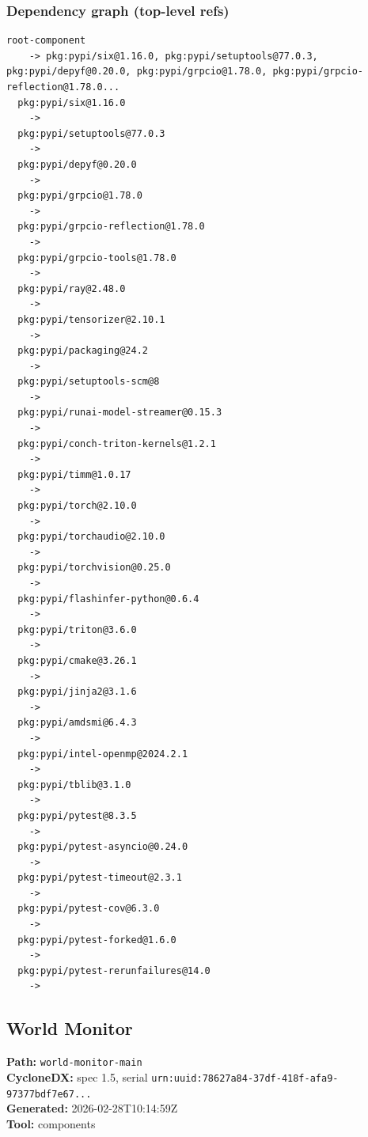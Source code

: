 \documentclass[11pt,a4paper]{article}
\begin{document}
\subsubsection*{Dependency graph (top-level refs)}
\begin{lstlisting}[style=depgraph]
  root-component
    -> pkg:pypi/six@1.16.0, pkg:pypi/setuptools@77.0.3, pkg:pypi/depyf@0.20.0, pkg:pypi/grpcio@1.78.0, pkg:pypi/grpcio-reflection@1.78.0...
  pkg:pypi/six@1.16.0
    -> 
  pkg:pypi/setuptools@77.0.3
    -> 
  pkg:pypi/depyf@0.20.0
    -> 
  pkg:pypi/grpcio@1.78.0
    -> 
  pkg:pypi/grpcio-reflection@1.78.0
    -> 
  pkg:pypi/grpcio-tools@1.78.0
    -> 
  pkg:pypi/ray@2.48.0
    -> 
  pkg:pypi/tensorizer@2.10.1
    -> 
  pkg:pypi/packaging@24.2
    -> 
  pkg:pypi/setuptools-scm@8
    -> 
  pkg:pypi/runai-model-streamer@0.15.3
    -> 
  pkg:pypi/conch-triton-kernels@1.2.1
    -> 
  pkg:pypi/timm@1.0.17
    -> 
  pkg:pypi/torch@2.10.0
    -> 
  pkg:pypi/torchaudio@2.10.0
    -> 
  pkg:pypi/torchvision@0.25.0
    -> 
  pkg:pypi/flashinfer-python@0.6.4
    -> 
  pkg:pypi/triton@3.6.0
    -> 
  pkg:pypi/cmake@3.26.1
    -> 
  pkg:pypi/jinja2@3.1.6
    -> 
  pkg:pypi/amdsmi@6.4.3
    -> 
  pkg:pypi/intel-openmp@2024.2.1
    -> 
  pkg:pypi/tblib@3.1.0
    -> 
  pkg:pypi/pytest@8.3.5
    -> 
  pkg:pypi/pytest-asyncio@0.24.0
    -> 
  pkg:pypi/pytest-timeout@2.3.1
    -> 
  pkg:pypi/pytest-cov@6.3.0
    -> 
  pkg:pypi/pytest-forked@1.6.0
    -> 
  pkg:pypi/pytest-rerunfailures@14.0
    -> 
\end{lstlisting}

\subsection{World Monitor}
\textbf{Path:} \texttt{world-monitor-main}
\\ \textbf{CycloneDX:} spec 1.5, serial \texttt{urn:uuid:78627a84-37df-418f-afa9-97377bdf7e67...}
\\ \textbf{Generated:} 2026-02-28T10:14:59Z
\\ \textbf{Tool:} components
\end{document}
